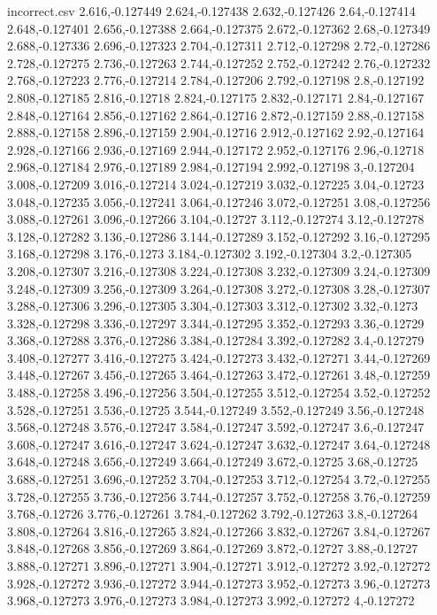 \begin{filecontents*}{incorrect.csv}
2.616,-0.127449
2.624,-0.127438
2.632,-0.127426
2.64,-0.127414
2.648,-0.127401
2.656,-0.127388
2.664,-0.127375
2.672,-0.127362
2.68,-0.127349
2.688,-0.127336
2.696,-0.127323
2.704,-0.127311
2.712,-0.127298
2.72,-0.127286
2.728,-0.127275
2.736,-0.127263
2.744,-0.127252
2.752,-0.127242
2.76,-0.127232
2.768,-0.127223
2.776,-0.127214
2.784,-0.127206
2.792,-0.127198
2.8,-0.127192
2.808,-0.127185
2.816,-0.12718
2.824,-0.127175
2.832,-0.127171
2.84,-0.127167
2.848,-0.127164
2.856,-0.127162
2.864,-0.12716
2.872,-0.127159
2.88,-0.127158
2.888,-0.127158
2.896,-0.127159
2.904,-0.12716
2.912,-0.127162
2.92,-0.127164
2.928,-0.127166
2.936,-0.127169
2.944,-0.127172
2.952,-0.127176
2.96,-0.12718
2.968,-0.127184
2.976,-0.127189
2.984,-0.127194
2.992,-0.127198
3,-0.127204
3.008,-0.127209
3.016,-0.127214
3.024,-0.127219
3.032,-0.127225
3.04,-0.12723
3.048,-0.127235
3.056,-0.127241
3.064,-0.127246
3.072,-0.127251
3.08,-0.127256
3.088,-0.127261
3.096,-0.127266
3.104,-0.12727
3.112,-0.127274
3.12,-0.127278
3.128,-0.127282
3.136,-0.127286
3.144,-0.127289
3.152,-0.127292
3.16,-0.127295
3.168,-0.127298
3.176,-0.1273
3.184,-0.127302
3.192,-0.127304
3.2,-0.127305
3.208,-0.127307
3.216,-0.127308
3.224,-0.127308
3.232,-0.127309
3.24,-0.127309
3.248,-0.127309
3.256,-0.127309
3.264,-0.127308
3.272,-0.127308
3.28,-0.127307
3.288,-0.127306
3.296,-0.127305
3.304,-0.127303
3.312,-0.127302
3.32,-0.1273
3.328,-0.127298
3.336,-0.127297
3.344,-0.127295
3.352,-0.127293
3.36,-0.12729
3.368,-0.127288
3.376,-0.127286
3.384,-0.127284
3.392,-0.127282
3.4,-0.127279
3.408,-0.127277
3.416,-0.127275
3.424,-0.127273
3.432,-0.127271
3.44,-0.127269
3.448,-0.127267
3.456,-0.127265
3.464,-0.127263
3.472,-0.127261
3.48,-0.127259
3.488,-0.127258
3.496,-0.127256
3.504,-0.127255
3.512,-0.127254
3.52,-0.127252
3.528,-0.127251
3.536,-0.12725
3.544,-0.127249
3.552,-0.127249
3.56,-0.127248
3.568,-0.127248
3.576,-0.127247
3.584,-0.127247
3.592,-0.127247
3.6,-0.127247
3.608,-0.127247
3.616,-0.127247
3.624,-0.127247
3.632,-0.127247
3.64,-0.127248
3.648,-0.127248
3.656,-0.127249
3.664,-0.127249
3.672,-0.12725
3.68,-0.12725
3.688,-0.127251
3.696,-0.127252
3.704,-0.127253
3.712,-0.127254
3.72,-0.127255
3.728,-0.127255
3.736,-0.127256
3.744,-0.127257
3.752,-0.127258
3.76,-0.127259
3.768,-0.12726
3.776,-0.127261
3.784,-0.127262
3.792,-0.127263
3.8,-0.127264
3.808,-0.127264
3.816,-0.127265
3.824,-0.127266
3.832,-0.127267
3.84,-0.127267
3.848,-0.127268
3.856,-0.127269
3.864,-0.127269
3.872,-0.12727
3.88,-0.12727
3.888,-0.127271
3.896,-0.127271
3.904,-0.127271
3.912,-0.127272
3.92,-0.127272
3.928,-0.127272
3.936,-0.127272
3.944,-0.127273
3.952,-0.127273
3.96,-0.127273
3.968,-0.127273
3.976,-0.127273
3.984,-0.127273
3.992,-0.127272
4,-0.127272
\end{filecontents*}


